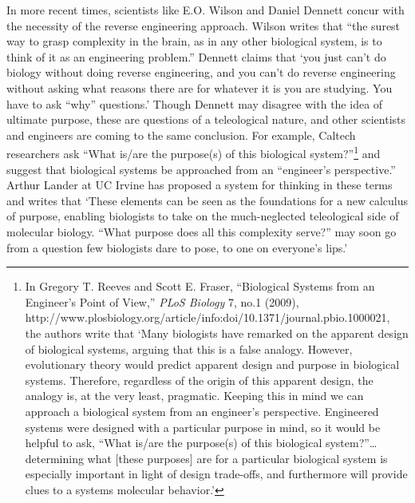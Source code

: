 In more recent times, scientists like E.O. Wilson and Daniel Dennett
concur with the necessity of the reverse engineering approach. Wilson
writes that “the surest way to grasp complexity in the brain, as in any
other biological system, is to think of it as an engineering
problem.”\citep[][pg. 112]{wilson1998} Dennett claims that ‘you just can’t do
biology without doing reverse engineering, and you can’t do reverse
engineering without asking what reasons there are for whatever it is
you are studying. You have to ask “why” questions.’\citep[][pg. 213]{dennett1996}
Though Dennett may disagree with the idea of ultimate purpose, these
are questions of a teleological nature, and other scientists and
engineers are coming to the same conclusion. For example, Caltech
researchers ask “What is/are the purpose(s) of this biological
system?”\footnote{
In Gregory T. Reeves and Scott E. Fraser,
“Biological Systems from an Engineer’s Point of View,” \textit{PLoS
Biology} 7, no.1 (2009),
http://www.plosbiology.org/article/info:doi/10.1371/journal.pbio.1000021,
the authors write that ‘Many biologists have remarked on the apparent
design of biological systems, arguing that this is a false analogy.
However, evolutionary theory would predict apparent design and purpose
in biological systems. Therefore, regardless of the origin of this
apparent design, the analogy is, at the very least, pragmatic. Keeping
this in mind we can approach a biological system from an engineer’s
perspective. Engineered systems were designed with a particular purpose
in mind, so it would be helpful to ask, “What is/are the purpose(s) of
this biological system?”…determining what [these purposes] are for a
particular biological system is especially important in light of design
trade-offs, and furthermore will provide clues to a systems molecular
behavior.’
} and suggest that biological systems be
approached from an “engineer’s perspective.” Arthur Lander at UC Irvine
has proposed a system for thinking in these terms and writes that
‘These elements can be seen as the foundations for a new calculus of
purpose, enabling biologists to take on the much-neglected teleological
side of molecular biology. “What purpose does all this complexity
serve?” may soon go from a question few biologists dare to pose, to one
on everyone’s lips.’\citep{lander2004}


